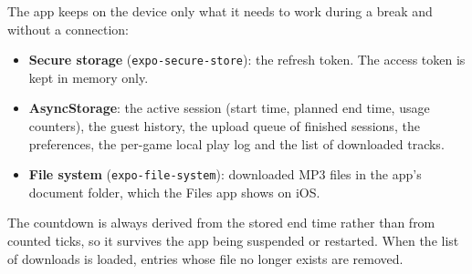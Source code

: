 The app keeps on the device only what it needs to work during a break and
without a connection:
\begin{itemize}[leftmargin=1.8em,itemsep=2pt]
  \item \textbf{Secure storage} (\texttt{expo-secure-store}): the refresh
        token. The access token is kept in memory only.
  \item \textbf{AsyncStorage}: the active session (start time, planned end
        time, usage counters), the guest history, the upload queue of finished
        sessions, the preferences, the per-game local play log and the list of
        downloaded tracks.
  \item \textbf{File system} (\texttt{expo-file-system}): downloaded MP3
        files in the app's document folder, which the Files app shows on iOS.
\end{itemize}
The countdown is always derived from the stored end time rather than from
counted ticks, so it survives the app being suspended or restarted. When the
list of downloads is loaded, entries whose file no longer exists are removed.

